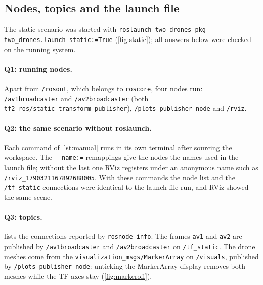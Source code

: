 \documentclass[a4paper]{tufte-handout}
\begin{document}


\subsection{Nodes, topics and the launch file}

The static scenario was started with
\texttt{roslaunch two\_drones\_pkg two\_drones.launch static:=True}
(\cref{fig:static}); all answers below were checked on the running system.

\paragraph{Q1: running nodes.}
Apart from \texttt{/rosout}, which belongs to \texttt{roscore}, four nodes run:
\texttt{/av1broadcaster} and \texttt{/av2broadcaster}
(both \texttt{tf2\_ros/static\_transform\_publisher}),
\texttt{/plots\_publisher\_node} and \texttt{/rviz}.

\paragraph{Q2: the same scenario without roslaunch.}
Each command of \cref{lst:manual} runs in its own terminal after sourcing the
workspace.
The \texttt{\_\_name:=} remappings give the nodes the names used in the launch
file; without the last one RViz registers under an anonymous name such as
\texttt{/rviz\_1790321167892688005}.
With these commands the node list and the \texttt{/tf\_static} connections
were identical to the launch-file run, and RViz showed the same scene.



\paragraph{Q3: topics.}
 lists the connections reported by \texttt{rosnode info}.
The frames \texttt{av1} and \texttt{av2} are published by
\texttt{/av1broadcaster} and \texttt{/av2broadcaster} on \texttt{/tf\_static}.
The drone meshes come from the \texttt{visualization\_msgs/MarkerArray} on
\texttt{/visuals}, published by \texttt{/plots\_publisher\_node}: unticking the
MarkerArray display removes both meshes while the TF axes stay
(\cref{fig:markeroff}).
\end{document}
